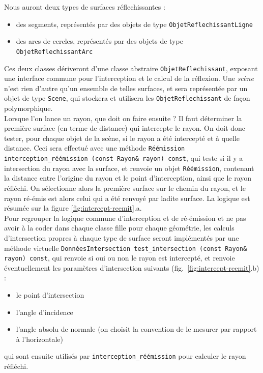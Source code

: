 \documentclass{book}
\newcommand{\inline}[1]{\texttt{#1}}
\begin{document}
Nous auront deux types de surfaces réflechissantes :
\begin{itemize}
  \item des segments, représentés par des objets de type \texttt{ObjetReflechissantLigne}
  \item des arcs de cercles, représentés par des objets de type \texttt{ObjetReflechissantArc}
\end{itemize}
Ces deux classes dériveront d'une classe abstraire \texttt{ObjetReflechissant}, exposant une interface commune pour l'interception et le calcul de la réflexion. Une \emph{scène} n'est rien d'autre qu'un ensemble de telles surfaces, et sera représentée par un objet de type \texttt{Scene}, qui stockera et utilisera les \texttt{ObjetReflechissant} de façon polymorphique.\\

Lorsque l'on lance un rayon, que doit on faire ensuite ? Il faut déterminer la première surface (en terme de distance) qui intercepte le rayon. On doit donc tester, pour chaque objet de la scène, si le rayon a été intercepté et à quelle distance. Ceci sera effectué avec une méthode \inline{Réémission interception_réémission (const Rayon& rayon) const}, qui teste si il y a intersection du rayon avec la surface, et renvoie un objet \inline{Réémission}, contenant la distance entre l'origine du rayon et le point d'interception, ainsi que le rayon réfléchi. On sélectionne alors la première surface sur le chemin du rayon, et le rayon ré-émis est alors celui qui a été renvoyé par ladite surface. La logique est résumée sur la figure \ref{fig:intercept-reemit}.a.\\

Pour regrouper la logique commune d'interception et de ré-émission et ne pas avoir à la coder dans chaque classe fille pour chaque géométrie, les calculs d'intersection propres à chaque type de surface seront implémentés par une méthode virtuelle \inline{DonnéesIntersection test_intersection (const Rayon& rayon) const}, qui renvoie si oui ou non le rayon est intercepté, et renvoie éventuellement les paramètres d'intersection suivants (fig.\ \ref{fig:intercept-reemit}.b) :
\begin{itemize}
  \item le point d'intersection 
  \item l'angle d'incidence
  \item l'angle absolu de normale (on choisit la convention de le mesurer par rapport à l'horizontale)
\end{itemize}
qui sont ensuite utilisés par \inline{interception_réémission} pour calculer le rayon réfléchi.
\end{document}
